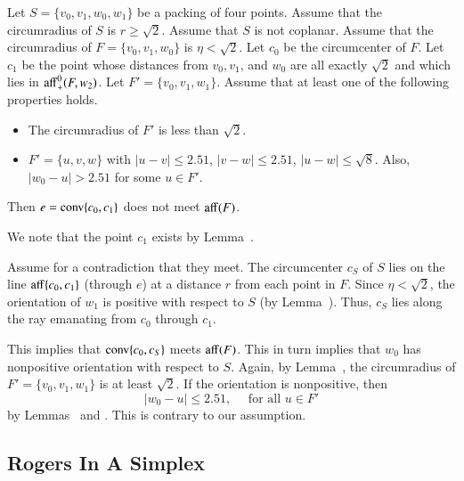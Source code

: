 \begin{tarskidata}
\begin{tarski}
\begin{lemma}
Let $S=\{v_0,v_1,w_0,w_1\}$ be a packing of four points.
Assume that the circumradius of $S$ is $r\ge \sqrt2$.  Assume
that $S$ is not coplanar.   Assume
that the circumradius of $F=\{v_0,v_1,w_0\}$ is
  $\eta < \sqrt2$.   Let $c_0$ be the circumcenter of $F$.
Let $c_1$ be the point whose distances from $v_0,v_1$, and $w_0$ are
all exactly $\sqrt2$ and which lies in
${\operatorname{aff}}^0_+(F,w_2)$.
Let $F'=\{v_0,v_1,w_1\}$.  Assume that at least one of
the following
properties holds.
\begin{itemize}
  \item The circumradius of $F'$ is less than $\sqrt2$.
  \item $F'=\{u,v,w\}$ with $|u-v| \le 2.51$, $|v-w|\le 2.51$,
        $|u-w|\le\sqrt8$. Also, $|w_0-u|>2.51$ for some $u\in F'$.
\end{itemize}

Then $e={\operatorname{conv}}\{c_0,c_1\}$ does not
meet ${\operatorname{aff}}(F)$.
\end{lemma}

\begin{proved}   We note that the point $c_1$ exists 
by Lemma~.

Assume for a contradiction that they meet.
The circumcenter $c_S$ of $S$ lies on
the line ${\operatorname{aff}}\{c_0,c_1\}$ (through $e$) at a
distance $r$ from each point in $F$.  
Since $\eta < \sqrt2$, the orientation of $w_1$ is positive
with respect to $S$ (by Lemma~). 
Thus, $c_S$ lies along
the ray emanating from $c_0$ through $c_1$.  

This implies that ${\operatorname{conv}}\{c_0,c_S\}$ meets ${\operatorname{aff}}(F)$.
This in turn implies that $w_0$ has nonpositive orientation with
respect to $S$.  Again, by Lemma~, the
circumradius of $F'=\{v_0,v_1,w_1\}$ is at least $\sqrt2$.
If the orientation is
nonpositive, then 
   $$|w_0-u|\le 2.51,\quad\text{ for all } u\in F'$$
by Lemmas~ and
. This is contrary to our assumption.
\swallowed\end{proved}
\end{tarski}






\begin{tarski}
\section{Rogers In A Simplex}


\end{tarski}
\end{tarskidata}
